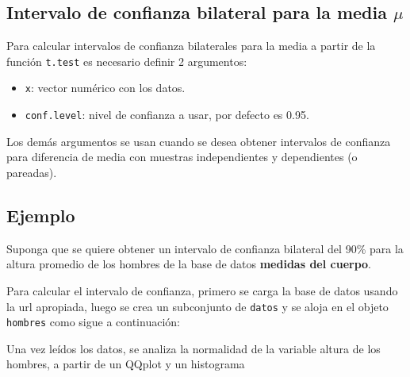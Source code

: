 \documentclass[10pt,]{krantz}
\makeatletter
\newenvironment{Shaded}{\begin{snugshade}}{\end{snugshade}}
\newcommand{\KeywordTok}[1]{\textcolor[rgb]{0.13,0.29,0.53}{\textbf{#1}}}
\newcommand{\DataTypeTok}[1]{\textcolor[rgb]{0.13,0.29,0.53}{#1}}
\newcommand{\StringTok}[1]{\textcolor[rgb]{0.31,0.60,0.02}{#1}}
\newcommand{\OperatorTok}[1]{\textcolor[rgb]{0.81,0.36,0.00}{\textbf{#1}}}
\newcommand{\NormalTok}[1]{#1}
\providecommand{\tightlist}{%
  \setlength{\itemsep}{0pt}\setlength{\parskip}{0pt}}
\newenvironment{kframe}{%
\medskip{}
\setlength{\fboxsep}{.8em}
 \def\at@end@of@kframe{}%
 \ifinner\ifhmode%
  \def\at@end@of@kframe{\end{minipage}}%
  \begin{minipage}{\columnwidth}%
 \fi\fi%
 \def\FrameCommand##1{\hskip\@totalleftmargin \hskip-\fboxsep
 \colorbox{shadecolor}{##1}\hskip-\fboxsep
     \hskip-\linewidth \hskip-\@totalleftmargin \hskip\columnwidth}%
 \MakeFramed {\advance\hsize-\width
   \@totalleftmargin\z@ \linewidth\hsize
   \@setminipage}}%
 {\par\unskip\endMakeFramed%
 \at@end@of@kframe}
\renewenvironment{Shaded}{\begin{kframe}}{\end{kframe}}
\makeatother
\begin{document}
\subsection{\texorpdfstring{Intervalo de confianza bilateral para la
media
\(\mu\)}{Intervalo de confianza bilateral para la media \textbackslash{}mu}}\label{intervalo-de-confianza-bilateral-para-la-media-mu}

Para calcular intervalos de confianza bilaterales para la media a partir
de la función \texttt{t.test} es necesario definir 2 argumentos:

\begin{itemize}
\tightlist
\item
  \texttt{x}: vector numérico con los datos.
\item
  \texttt{conf.level}: nivel de confianza a usar, por defecto es 0.95.
\end{itemize}

Los demás argumentos se usan cuando se desea obtener intervalos de
confianza para diferencia de media con muestras independientes y
dependientes (o pareadas).

\subsection*{Ejemplo}\label{ejemplo-54}


Suponga que se quiere obtener un intervalo de confianza bilateral del
90\% para la altura promedio de los hombres de la base de datos
\textbf{medidas del cuerpo}.

Para calcular el intervalo de confianza, primero se carga la base de
datos usando la url apropiada, luego se crea un subconjunto de
\texttt{datos} y se aloja en el objeto \texttt{hombres} como sigue a
continuación:

\begin{Shaded}
\end{Shaded}

Una vez leídos los datos, se analiza la normalidad de la variable altura
de los hombres, a partir de un QQplot y un histograma
\end{document}
